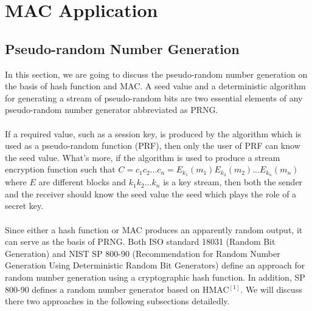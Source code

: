\documentclass[12pt,a4paper,oneside]{report}
\begin{document}
\chapter{  MAC Application}
\section{Pseudo-random Number Generation}
\noindent In this section, we are going to discuss the pseudo-random number generation on the basis of hash function and MAC. A seed value and a deterministic algorithm for generating a stream of pseudo-random bits are two essential elements of any pseudo-random number generator abbreviated as PRNG.\\
\\
\noindent If a required value, such as a session key, is produced by the algorithm which is used as a pseudo-random function (PRF), then only the user of PRF can know the seed value. What's more,  if the algorithm is used to produce a stream encryption function such that $C = c_1c_2...c_n = E_{k_1}(m_1)E_{k_2}(m_2)...E_{k_n}(m_n)$ where $E$ are different blocks and $k_1k_2...k_n$ is a key stream, then both the sender and the receiver should know the seed value the seed which plays the role of a secret key.\\
\\
\noindent Since either a hash function or MAC produces an apparently random output, it can serve as the basis of PRNG. Both ISO standard 18031 (Random Bit Generation) and NIST SP 800-90 (Recommendation for Random Number Generation Using Deterministic Random Bit Generators) define an approach for random number generation using a cryptographic hash function. In addition, SP 800-90 defines a random number generator based on HMAC$^{[1]}$. We will discuss there two approaches in the following subsections detailedly.\\
\end{document}
